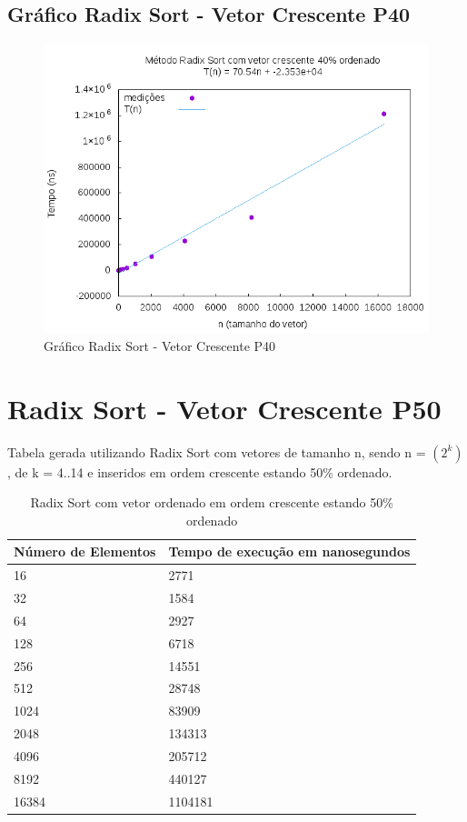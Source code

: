\documentclass[12pt,a4paper,twoside]{report}
\begin{document}
\subsection{Gráfico Radix Sort - Vetor Crescente P40}
\begin{figure}[H]
    \centering
    \includegraphics[width=0.7\linewidth]{graficos/RadixSort/vIntCrescenteP40/vIntCrescenteP40.png}
  \caption{Gráfico Radix Sort - Vetor Crescente P40}
\end{figure}

\section{Radix Sort - Vetor Crescente P50}
Tabela gerada utilizando Radix Sort com vetores de tamanho n, sendo n = $(2^k)$, de k = 4..14 e inseridos em ordem crescente estando 50\% ordenado.
\begin{table}[H]
\centering
\caption{Radix Sort com vetor ordenado em ordem crescente estando 50\% ordenado}
\label{my-label}
\begin{tabular}{|l|l|}
\hline
\multicolumn{1}{|c|}{\textbf{Número de Elementos}} & \multicolumn{1}{c|}{\textbf{Tempo de execução em nanosegundos}} \\ \hline
16 & 2771 \\ \hline
32 & 1584 \\ \hline
64 & 2927 \\ \hline
128 & 6718 \\ \hline
256 & 14551 \\ \hline
512 & 28748 \\ \hline
1024 & 83909 \\ \hline
2048 & 134313 \\ \hline
4096 & 205712 \\ \hline
8192 & 440127 \\ \hline
16384 & 1104181 \\ \hline
\end{tabular}
\end{table}
\end{document}
